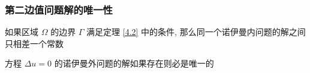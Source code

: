 \documentclass[10pt]{yerbaformat}
\begin{document}
\subsubsection{第二边值问题解的唯一性}

\begin{theorem}
    如果区域 $\Omega$ 的边界 $\Gamma$ 满足定理 \ref{4.2} 中的条件, 那么同一个诺伊曼内问题的解之间只相差一个常数
\end{theorem}

\begin{theorem}
    方程 $\Delta u =0$ 的诺伊曼外问题的解如果存在则必是唯一的
\end{theorem}

\end{document}
